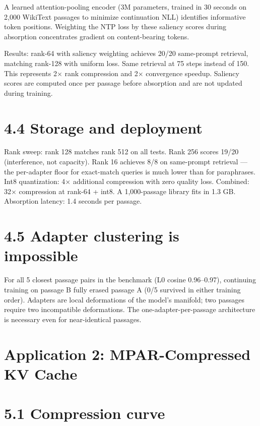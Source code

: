 A learned attention-pooling encoder (3M parameters, trained in 30 seconds on 2,000 WikiText passages to minimize continuation NLL) identifies informative token positions. Weighting the NTP loss by these saliency scores during absorption concentrates gradient on content-bearing tokens.

Results: rank-64 with saliency weighting achieves 20/20 same-prompt retrieval, matching rank-128 with uniform loss. Same retrieval at 75 steps instead of 150. This represents 2$\times$ rank compression and 2$\times$ convergence speedup. Saliency scores are computed once per passage before absorption and are not updated during training.

\section{4.4 Storage and deployment}\label{storage-and-deployment}

Rank sweep: rank 128 matches rank 512 on all tests. Rank 256 scores 19/20 (interference, not capacity). Rank 16 achieves 8/8 on same-prompt retrieval --- the per-adapter floor for exact-match queries is much lower than for paraphrases. Int8 quantization: 4$\times$ additional compression with zero quality loss. Combined: 32$\times$ compression at rank-64 + int8. A 1,000-passage library fits in 1.3 GB. Absorption latency: 1.4 seconds per passage.

\section{4.5 Adapter clustering is impossible}\label{adapter-clustering-is-impossible}

For all 5 closest passage pairs in the benchmark (L0 cosine 0.96--0.97), continuing training on passage B fully erased passage A (0/5 survived in either training order). Adapters are local deformations of the model's manifold; two passages require two incompatible deformations. The one-adapter-per-passage architecture is necessary even for near-identical passages.

\section{Application 2: MPAR-Compressed KV Cache}\label{application-2-mpar-compressed-kv-cache}

\section{5.1 Compression curve}\label{compression-curve}


